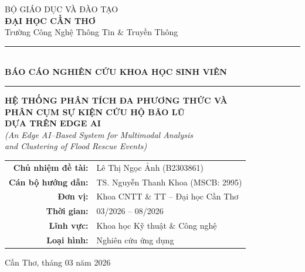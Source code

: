 \documentclass[12pt, a4paper]{report}
\begin{document}
\begin{titlepage}
\begin{center}
  {\large BỘ GIÁO DỤC VÀ ĐÀO TẠO}\\[4pt]
  {\Large\bfseries ĐẠI HỌC CẦN THƠ}\\[4pt]
  {\large Trường Công Nghệ Thông Tin \& Truyền Thông}\\[30pt]


  \vspace{20pt}
  \rule{\linewidth}{1.5pt}\\[6pt]
  {\LARGE\bfseries\color{headerblue}
    BÁO CÁO NGHIÊN CỨU KHOA HỌC SINH VIÊN}\\[6pt]
  \rule{\linewidth}{1.5pt}

  \vspace{18pt}
  {\large\bfseries
    HỆ THỐNG PHÂN TÍCH ĐA PHƯƠNG THỨC VÀ\\[4pt]
    PHÂN CỤM SỰ KIỆN CỨU HỘ BÃO LŨ\\[4pt]
    DỰA TRÊN EDGE AI}\\[6pt]
  {\normalsize\itshape
    (An Edge AI–Based System for Multimodal Analysis\\
    and Clustering of Flood Rescue Events)}

  \vspace{24pt}
  \begin{tabular}{rl}
    \textbf{Chủ nhiệm đề tài:}  & Lê Thị Ngọc Ảnh (B2303861) \\
    \textbf{Cán bộ hướng dẫn:}  & TS. Nguyễn Thanh Khoa (MSCB: 2995) \\
    \textbf{Đơn vị:}             & Khoa CNTT \& TT – Đại học Cần Thơ \\
    \textbf{Thời gian:}          & 03/2026 – 08/2026 \\
    \textbf{Lĩnh vực:}           & Khoa học Kỹ thuật \& Công nghệ \\
    \textbf{Loại hình:}          & Nghiên cứu ứng dụng \\
  \end{tabular}

  \vfill
  {\normalsize Cần Thơ, tháng 03 năm 2026}
\end{center}
\end{titlepage}

\end{document}

